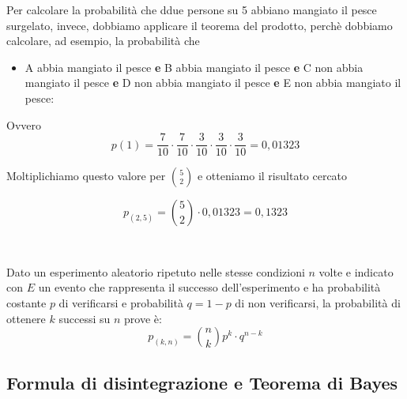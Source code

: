 \documentclass{article}     %
\begin{document}
\begin{ex}
                Per calcolare la probabilità che ddue persone su 5 abbiano mangiato il pesce surgelato, invece, dobbiamo applicare il teorema del prodotto, perchè dobbiamo calcolare, ad esempio, la probabilità che 
                \begin{itemize}
                    \item A abbia mangiato il pesce \textbf{e} B abbia mangiato il pesce \textbf{e} C non abbia mangiato il pesce \textbf{e} D non abbia mangiato il pesce \textbf{e} E non abbia mangiato il pesce:
                \end{itemize}
                Ovvero 
                \[p(1)=\frac{7}{10}\cdot\frac{7}{10}\cdot\frac{3}{10}\cdot\frac{3}{10}\cdot\frac{3}{10}=0,01323\]

                Moltiplichiamo questo valore per $\binom{5}{2}$ e otteniamo il risultato cercato

                \[p_{(2,5)}=\binom{5}{2}\cdot 0,01323=0,1323\]
                \end{ex}
                ~
                \begin{thm}
                    Dato un esperimento aleatorio ripetuto nelle stesse condizioni $n$ volte e indicato con $E$ un evento che rappresenta il successo dell'esperimento e ha probabilità costante $p$ di verificarsi e probabilità $q=1-p$ di non verificarsi, la probabilità di ottenere $k$ successi su $n$ prove è: \[p_{(k,n)}=\binom{n}{k}p^k\cdot q^{n-k}\]
                \end{thm}
            \subsection{Formula di disintegrazione e Teorema di Bayes}
\end{document}
